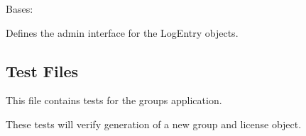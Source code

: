 \documentclass[letterpaper,10pt,english]{sphinxmanual}
\begin{document}

\begin{fulllineitems}
\label{api:mousedb.groups.admin.LogEntryAdmin}
Bases: 

Defines the admin interface for the LogEntry objects.

\begin{fulllineitems}
\label{api:mousedb.groups.admin.LogEntryAdmin.fields}
\end{fulllineitems}


\begin{fulllineitems}
\label{api:mousedb.groups.admin.LogEntryAdmin.list_display}
\end{fulllineitems}


\begin{fulllineitems}
\label{api:mousedb.groups.admin.LogEntryAdmin.media}
\end{fulllineitems}


\end{fulllineitems}



\subsection{Test Files}
\label{api:id18}\label{api:module-mousedb.groups.tests}
This file contains tests for the groups application.

These tests will verify generation of a new group and license object.
\end{document}
